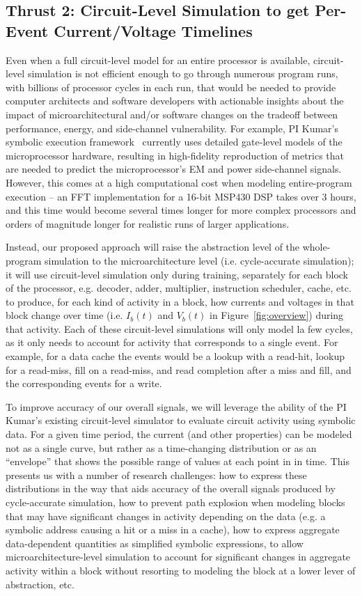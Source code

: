 \subsection{Thrust 2: Circuit-Level Simulation to get Per-Event Current/Voltage Timelines}

Even when a full circuit-level model for an entire processor is available, circuit-level simulation is not efficient enough to go through numerous program runs, with billions of processor cycles in each run, that would be needed to provide computer architects and software developers with actionable insights about the impact of microarchitectural and/or software changes on the tradeoff between performance, energy, and side-channel vulnerability. For example, PI Kumar's symbolic execution framework~\cite{cherupalli2017} currently uses detailed gate-level models of the microprocessor hardware, resulting in high-fidelity reproduction of metrics that are needed to predict the microprocessor's EM and power side-channel signals. However, this comes at a high computational cost when modeling entire-program execution -- an FFT implementation for a 16-bit MSP430 DSP takes over 3 hours, and this time would become several times longer for more complex processors and orders of magnitude longer for realistic runs of larger applications.

Instead, our proposed approach will raise the abstraction level of the whole-program simulation to the microarchitecture level (i.e. cycle-accurate simulation); it will use circuit-level simulation only during training, separately for each block of the processor, e.g. decoder, adder, multiplier, instruction scheduler, cache, etc. to produce, for each kind of activity in a block, how currents and voltages in that block change over time (i.e. $I_b(t)$ and $V_b(t)$ in Figure~\ref{fig:overview}) during that activity. Each of these circuit-level simulations will only model la few cycles, as it only needs to account for activity that corresponds to a single event. For example, for a data cache the events would be a lookup with a read-hit, lookup for a read-miss, fill on a read-miss, and read completion after a miss and fill, and the corresponding events for a write.

To improve accuracy of our overall signals, we will leverage the ability of the PI Kumar's existing circuit-level simulator to evaluate circuit activity using symbolic data.  For a given time period, the current (and other properties) can be modeled not as a single curve, but rather as a time-changing distribution or as an  ``envelope'' that shows the possible range of values at each point in in time. This presents us with a number of research challenges: how to express these distributions in the way that aids accuracy of the overall signals produced by cycle-accurate simulation, how to prevent path explosion when modeling blocks that may have significant changes in activity depending on the data (e.g. a symbolic address causing a hit or a miss in a cache), how to express aggregate data-dependent quantities as simplified symbolic expressions, to allow microarchitecture-level simulation to account for significant changes in aggregate activity within a block without resorting to modeling the block at a lower lever of abstraction, etc.

